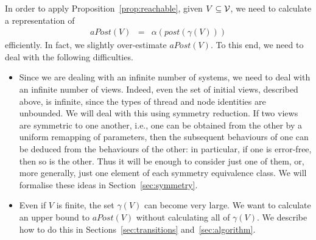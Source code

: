 In order to apply Proposition~\ref{prop:reachable}, given $V \subseteq \mathcal{V}$, we
need to calculate a representation of
%
\begin{eqnarray*}
aPost(V) & = & \alpha(post(\gamma(V)))
\end{eqnarray*}
efficiently.  In fact, we slightly over-estimate $aPost(V)$.  To this end, we
need to deal with the following difficulties.
%
\begin{itemize}
\item Since we are dealing with an infinite number of systems, we need to deal
  with an infinite number of views.  Indeed, even the set of initial views,
  described above, is infinite, since the types of thread and node identities
  are unbounded.  We will deal with this using symmetry reduction.  If two
  views are symmetric to one another, i.e., one can be obtained from the other
  by a uniform remapping of parameters, then the subsequent behaviours of one
  can be deduced from the behaviours of the other: in particular, if one is
  error-free, then so is the other.  Thus it will be enough to consider just
  one of them, or, more generally, just one element of each symmetry
  equivalence class.  We will formalise these ideas in
  Section~\ref{sec:symmetry}.

\item Even if $V$ is finite, the set $\gamma(V)$ can become very large.  We
  want to calculate an upper bound to $aPost(V)$ without calculating all of
  $\gamma(V)$.  We describe how to do this in Sections~\ref{sec:transitions}
  and~\ref{sec:algorithm}.
\end{itemize}




